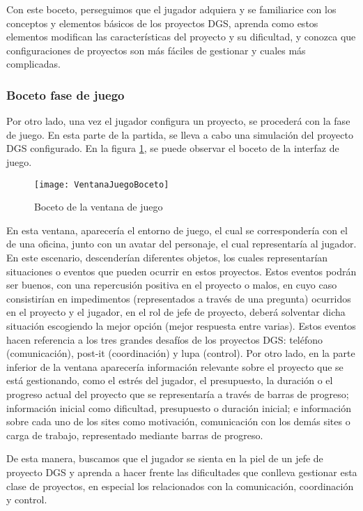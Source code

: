 Con este boceto, perseguimos que el jugador adquiera y se familiarice con los conceptos y elementos básicos de los proyectos DGS, aprenda como estos elementos modifican las características del proyecto y su dificultad, y conozca que configuraciones de proyectos son más fáciles de gestionar y cuales más complicadas. 

\subsubsection*{Boceto fase de juego}
\label{BocetoFaseJuego}

Por otro lado, una vez el jugador configura un proyecto, se procederá con la fase de juego. En esta parte de la partida, se lleva a cabo una simulación del proyecto DGS configurado. En la figura \ref{fig:VentanaJuegoBoceto}, se puede observar el boceto de la interfaz de juego.

\begin{figure}[htb]
	\centering
	\texttt{[image: VentanaJuegoBoceto]}
	\caption[Boceto de la ventana de juego]{Boceto de la ventana de juego}
	\label{fig:VentanaJuegoBoceto}
\end{figure}

En esta ventana, aparecería el entorno de juego, el cual se correspondería con el de una oficina, junto con un avatar del personaje, el cual representaría al jugador. En este escenario, descenderían diferentes objetos, los cuales representarían situaciones o eventos que pueden ocurrir en estos proyectos. Estos eventos podrán ser buenos, con una repercusión positiva en el proyecto o malos, en cuyo caso consistirían en impedimentos (representados a través de una pregunta) ocurridos en el proyecto y el jugador, en el rol de jefe de proyecto, deberá solventar dicha situación escogiendo la mejor opción (mejor respuesta entre varias). Estos eventos hacen referencia a los tres grandes desafíos de los proyectos DGS: teléfono (comunicación), post-it (coordinación) y lupa (control). Por otro lado, en la parte inferior de la ventana aparecería información relevante sobre el proyecto que se está gestionando, como el estrés del jugador, el presupuesto, la duración o el progreso actual del proyecto que se representaría a través de barras de progreso; información inicial como dificultad, presupuesto o duración inicial; e información sobre cada uno de los sites como motivación, comunicación con los demás sites o carga de trabajo, representado mediante barras de progreso.

De esta manera, buscamos que el jugador se sienta en la piel de un jefe de proyecto DGS y aprenda a hacer frente las dificultades que conlleva gestionar esta clase de proyectos, en especial los relacionados con la comunicación, coordinación y control.

